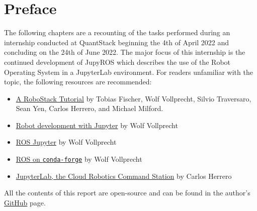 \chapter*{Preface}

The following chapters are a recounting of the tasks performed during an internship conducted at QuantStack beginning the 4th of April 2022 and concluding on the 24th of June 2022. The major focus of this internship is the continued development of JupyROS which describes the use of the Robot Operating System in a JupyterLab environment. For readers unfamiliar with the topic, the following resources are recommended:

\begin{itemize}
    \item \href{https://arxiv.org/pdf/2104.12910.pdf}{A RoboStack Tutorial} by Tobias Fischer, Wolf Vollprecht, Silvio Traversaro, Sean Yen, Carlos Herrero, and Michael Milford.
    \item \href{https://wolfv.medium.com/robot-development-with-jupyter-ddae16d4e688}{Robot development with Jupyter} by Wolf Vollprecht
    \item \href{https://blog.jupyter.org/ros-jupyter-b7e82b5e1202}{ROS \@ Jupyter} by Wolf Vollprecht
    \item \href{https://wolfv.medium.com/ros-on-conda-forge-dca6827ac4b6}{ROS on \texttt{conda-forge}} by Wolf Vollprecht
    \item \href{https://blog.jupyter.org/jupyterlab-ros-3dc9dab7f421}{JupyterLab, the Cloud Robotics Command Station} by Carlos Herrero
\end{itemize}

\noindent All the contents of this report are open-source and can be found in the author's \href{https://github.com/ihuicatl}{GitHub} page.